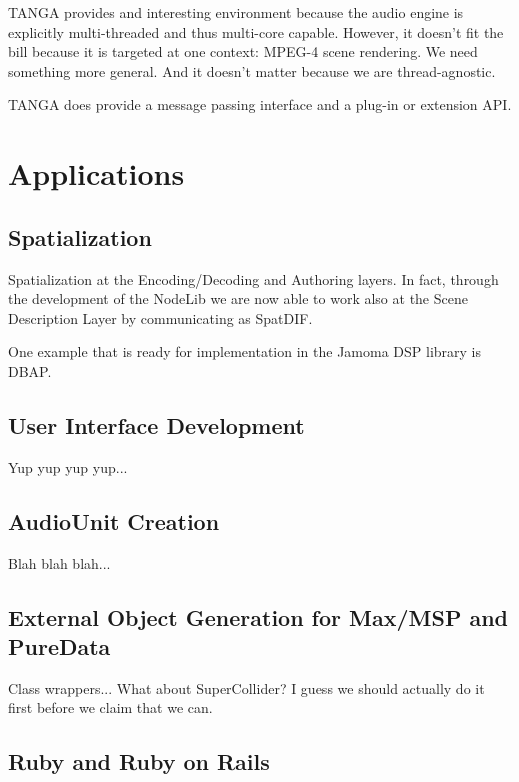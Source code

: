 \documentclass[twoside,10pt]{article}
\begin{document}
TANGA provides and interesting environment because the audio engine is explicitly multi-threaded and thus multi-core capable\cite{Reiter:2007}.  However, it doesn't fit the bill because it is targeted at one context: MPEG-4 scene rendering.  We need something more general.  And it doesn't matter because we are thread-agnostic.

TANGA does provide a message passing interface and a plug-in or extension API.



\section{Applications} %

\subsection{Spatialization}

Spatialization at the Encoding/Decoding and Authoring layers\cite{Peters:2009}.  In fact, through the development of the NodeLib we are now able to work also at the Scene Description Layer by communicating as SpatDIF\cite{Peters:2008spatdif}.

One example that is ready for implementation in the Jamoma DSP library is DBAP\cite{Lossius:2009}.


\subsection{User Interface Development}

Yup yup yup yup...

\subsection{AudioUnit Creation}

Blah blah blah...

\subsection{External Object Generation for Max/MSP and PureData}

Class wrappers...  What about SuperCollider?  I guess we should actually do it first before we claim that we can.

\subsection{Ruby and Ruby on Rails}
\end{document}
